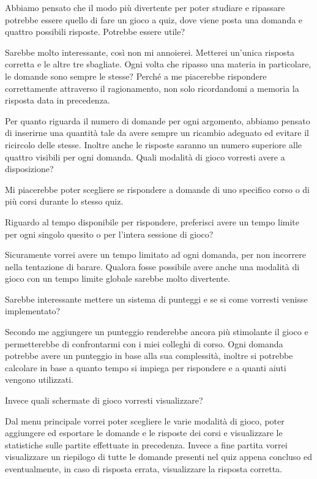     
    \begin{QandA}
        \item Abbiamo pensato che il modo più divertente per poter studiare e ripassare potrebbe essere quello di fare un gioco a quiz, dove viene posta una domanda e quattro possibili risposte. Potrebbe essere utile?
            \begin{answered}
            Sarebbe molto interessante, così non mi annoierei. Metterei un'unica risposta corretta e le altre tre sbagliate. Ogni volta che ripasso una materia in particolare, le domande sono sempre le stesse? Perché a me piacerebbe rispondere correttamente attraverso il ragionamento, non solo ricordandomi a memoria la risposta data in precedenza.
            \end{answered}
        \item Per quanto riguarda il numero di domande per ogni argomento, abbiamo pensato di inserirne una quantità tale da avere sempre un ricambio adeguato ed evitare il ricircolo delle stesse. Inoltre anche le risposte saranno un numero superiore alle quattro visibili per ogni domanda.
        Quali modalità di gioco vorresti avere a disposizione?
            \begin{answered}
            Mi piacerebbe poter scegliere se rispondere a domande di uno specifico corso o di più corsi durante lo stesso quiz.
            \end{answered}
        \item Riguardo al tempo disponibile per rispondere, preferisci avere un tempo limite per ogni singolo quesito o per l'intera sessione di gioco?
            \begin{answered}
            Sicuramente vorrei avere un tempo limitato ad ogni domanda, per non incorrere nella tentazione di barare. Qualora fosse possibile avere anche una modalità di gioco con un tempo limite globale sarebbe molto divertente. 
            \end{answered}
        \item Sarebbe interessante mettere un sistema di punteggi e se si come vorresti venisse implementato?
            \begin{answered}
            Secondo me aggiungere un punteggio renderebbe ancora più stimolante il gioco e permetterebbe di confrontarmi con i miei colleghi di corso. Ogni domanda potrebbe avere un punteggio in base alla sua complessità, inoltre si potrebbe calcolare in base a quanto tempo si impiega per rispondere e a quanti aiuti vengono utilizzati.
            \end{answered}
        \item Invece quali schermate di gioco vorresti visualizzare?
            \begin{answered}
            Dal menu principale vorrei poter scegliere le varie modalità di gioco, poter aggiungere ed esportare le domande e le risposte dei corsi e visualizzare le statistiche sulle partite effettuate in precedenza. Invece a fine partita vorrei visualizzare un riepilogo di tutte le domande presenti nel quiz appena concluso ed eventualmente, in caso di risposta errata, visualizzare la risposta corretta.
            \end{answered}
    \end{QandA}

